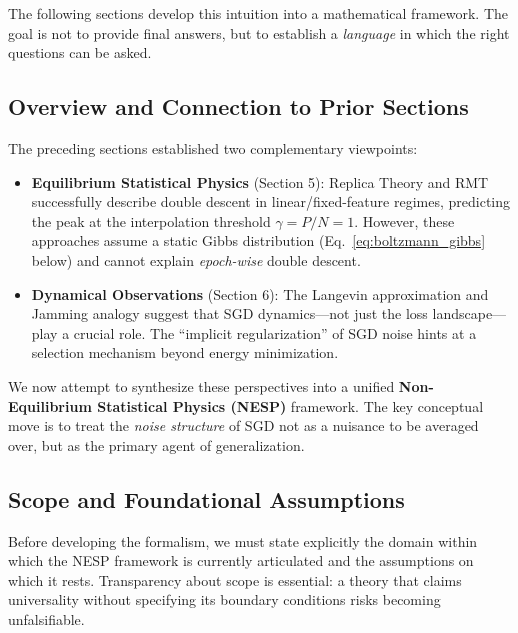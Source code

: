 \documentclass[
  journal=largetwo,
  simfonts=false,
  year=2025,
  volume=37,
]{cup-journal}
\begin{document}
The following sections develop this intuition into a mathematical framework. The goal is not to provide final answers, but to establish a \textit{language} in which the right questions can be asked.

\subsection{Overview and Connection to Prior Sections}

The preceding sections established two complementary viewpoints: 
\begin{itemize}
    \item \textbf{Equilibrium Statistical Physics} (Section 5): Replica Theory and RMT successfully describe double descent in linear/fixed-feature regimes, predicting the peak at the interpolation threshold $\gamma = P/N = 1$. However, these approaches assume a static Gibbs distribution (Eq.~\eqref{eq:boltzmann_gibbs} below) and cannot explain \textit{epoch-wise} double descent.
    \item \textbf{Dynamical Observations} (Section 6): The Langevin approximation and Jamming analogy suggest that SGD dynamics---not just the loss landscape---play a crucial role. The ``implicit regularization'' of SGD noise hints at a selection mechanism beyond energy minimization.
\end{itemize}

We now attempt to synthesize these perspectives into a unified \textbf{Non-Equilibrium Statistical Physics (NESP)} framework. The key conceptual move is to treat the \textit{noise structure} of SGD not as a nuisance to be averaged over, but as the primary agent of generalization.

\subsection{Scope and Foundational Assumptions}\label{sec:nesp_scope}

Before developing the formalism, we must state explicitly the domain within which the NESP framework is currently articulated and the assumptions on which it rests. Transparency about scope is essential: a theory that claims universality without specifying its boundary conditions risks becoming unfalsifiable.
\end{document}
